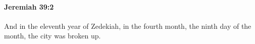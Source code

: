 
		\paragraph{Jeremiah 39:2} %
			\label{JEREMIAH-39-2}

			And in the eleventh year of Zedekiah, in the fourth month, the ninth day of the month, the city was broken up.


